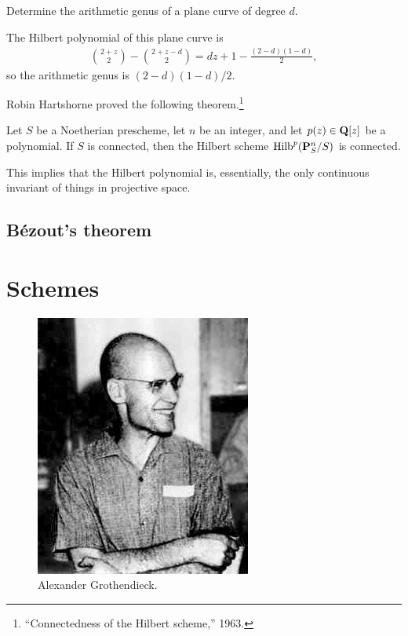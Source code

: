 \documentclass [11 pt, oneside, margin = 1 in] {article}
\begin{document}
\begin{problem}
	Determine the arithmetic genus of a plane curve of degree $d$.
\end{problem}

The Hilbert polynomial of this plane curve is
\begin{align*}
	\binom{2+z}{2} - \binom{2+z-d}{2} = dz + 1 - \frac{(2-d) (1-d)}{2},
\end{align*}
so the arithmetic genus is $(2-d) (1-d)/2$.

Robin Hartshorne proved the following theorem.\footnote{``Connectedness of the Hilbert scheme,'' 1963.}

\begin{theorem}[Hartshorne]\label{}\index{}\text{}
Let $S$ be a Noetherian prescheme, let $n$ be an integer, and let $p(z)\in\mathbf Q [z]$ be a polynomial. If $S$ is connected, then the Hilbert scheme $\operatorname{Hilb}^p(\mathbf{P}^n_S/S)$ is connected.
\end{theorem}

This implies that the Hilbert polynomial is, essentially, the only continuous invariant of things in projective space.
\subsection{B\'ezout's theorem}


\section{Schemes}

\begin{figure}
\begin{center}
\includegraphics[scale=0.8]{images/groth}
\caption{Alexander Grothendieck.}
\end{center}
\end{figure}
\end{document}
